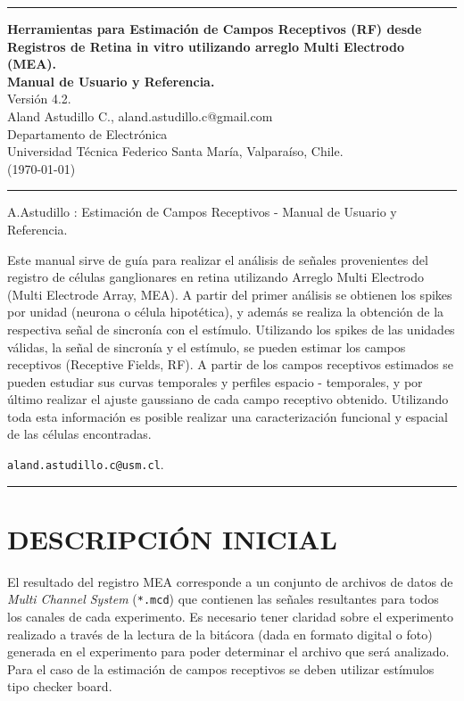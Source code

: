 \documentclass[10pt]{article}
\begin{document}
\hrule

\begin{center}
\Large \textbf{Herramientas para Estimación de Campos Receptivos (RF) desde Registros de Retina in vitro utilizando arreglo Multi Electrodo (MEA).
\\
Manual de Usuario y Referencia.}
\\
\normalsize Versión 4.2.\\
Aland Astudillo C., aland.astudillo.c@gmail.com \\
Departamento de Electrónica \\
Universidad Técnica Federico Santa María, Valparaíso, Chile. \\
(\today)
\end{center}
\hrule \vspace{3mm}

%
{A.Astudillo \MakeLowercase{}: Estimación de Campos Receptivos - Manual de Usuario y Referencia.}

Este manual sirve de guía para realizar el análisis de señales provenientes del registro de células ganglionares en retina utilizando Arreglo Multi Electrodo (Multi Electrode Array, MEA).  A partir del primer análisis se obtienen los spikes por unidad (neurona o célula hipotética), y además se realiza la obtención de la respectiva señal de sincronía con el estímulo. Utilizando los spikes de las unidades válidas, la señal de sincronía y el estímulo, se pueden estimar los campos receptivos (Receptive Fields, RF). A partir de los campos receptivos estimados se pueden estudiar sus curvas temporales y perfiles espacio - temporales, y por último realizar el ajuste gaussiano de cada campo receptivo obtenido. Utilizando toda esta información es posible realizar una caracterización funcional y espacial de las células encontradas.

\texttt{aland.astudillo.c@usm.cl}.
\\
\hrule \vspace{3mm}

\tableofcontents

\newpage

\section{ \textbf{DESCRIPCIÓN INICIAL} }

El resultado del registro MEA corresponde a un conjunto de archivos de datos de \textit{Multi Channel System} (\verb+*.mcd+) que contienen las señales resultantes para todos los canales de cada experimento. Es necesario tener claridad sobre el experimento realizado a través de la lectura de la bitácora (dada en formato digital o foto) generada en el experimento para poder determinar el archivo que será analizado. Para el caso de la estimación de campos receptivos se deben utilizar estímulos tipo checker board.
\end{document}
